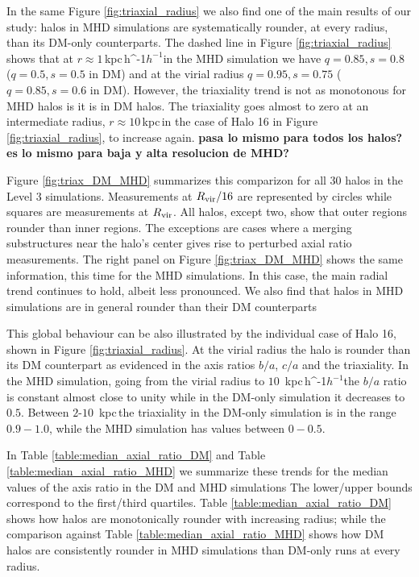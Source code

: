 \documentclass[a4paper,fleqn,usenatbib]{mnras}
\newcommand{\kpch}{\,{\rm kpc}\,\ifmmode h^{-1}\else $h^{-1}$\fi}
\newcommand{\kpc}{\,{\rm kpc}\,}
\begin{document}
In the same Figure \ref{fig:triaxial_radius} we also find one of the
main results of our study: halos in MHD simulations are systematically rounder, at
every radius, than its DM-only counterparts.  
The dashed line in Figure \ref{fig:triaxial_radius} shows that at
$r\approx 1$\kpch  in the MHD simulation we have $q=0.85, s=0.8$
($q=0.5, s=0.5$ in DM) and at the virial radius $q=0.95, s=0.75$
($q=0.85, s=0.6$ in DM).  
However, the triaxiality trend is not as monotonous for MHD halos is
it is in DM halos. 
The triaxiality goes almost to zero at an intermediate radius,
$r\approx 10$\kpc in the case of Halo 16 in Figure
\ref{fig:triaxial_radius}, to increase again. {\bf pasa lo mismo para
  todos los halos? es lo mismo para baja y alta resolucion de MHD?}
    

Figure \ref{fig:triax_DM_MHD} summarizes this comparizon for all 30 halos
in the Level 3 simulations. 
Measurements at $R_{\rm vir}/16$ are represented by circles while squares 
are measurements at $R_{\rm vir}$. 
All halos, except two, show that outer regions rounder than inner
regions.
The exceptions are cases where a merging substructures near  the
halo's center gives rise to perturbed axial ratio measurements. 
The right panel on Figure \ref{fig:triax_DM_MHD} shows the same information, this time for
the MHD simulations. 
In this case, the main radial trend continues to hold, albeit less
pronounced.
We also find that halos in MHD simulations are in general rounder than
their DM counterparts


This global behaviour can be also illustrated by the individual case
of Halo 16, shown in Figure \ref{fig:triaxial_radius}.
At the virial radius the halo is rounder than its DM counterpart as
evidenced in the axis ratios $b/a$, $c/a$ and the triaxiality.
In the MHD simulation, going from the virial radius to $10$ \kpch the
$b/a$ ratio is constant almost close to unity while in the DM-only
simulation it decreases to $0.5$.
Between $2$-$10$ \kpc the triaxiality in the DM-only simulation is in
the range $0.9-1.0$, while the MHD simulation has values between
$0-0.5$. 


In Table \ref{table:median_axial_ratio_DM} and Table \ref{table:median_axial_ratio_MHD}
we summarize these trends for the median values of the axis ratio in
the DM and MHD simulations
The lower/upper bounds correspond to the first/third quartiles. 
Table  \ref{table:median_axial_ratio_DM} shows how halos are
monotonically rounder with increasing radius; while the comparison
against Table \ref{table:median_axial_ratio_MHD} shows how DM halos
are consistently rounder in MHD simulations than DM-only runs at every
radius. 
\end{document}
